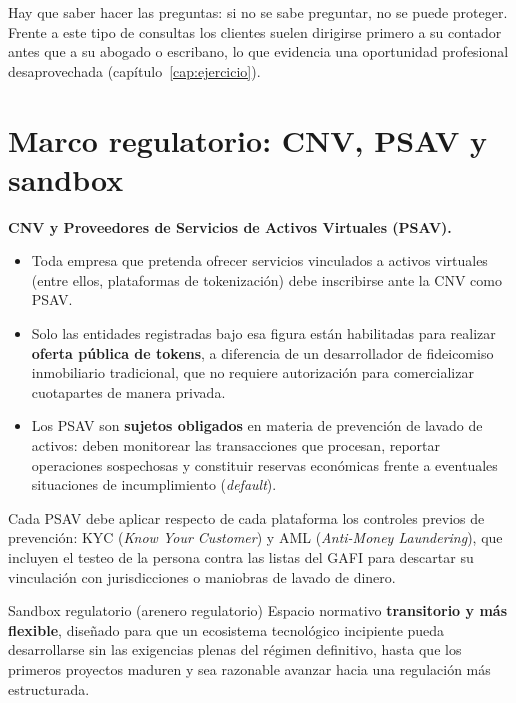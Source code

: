 \documentclass[12pt,oneside]{book}
\begin{document}
Hay que saber hacer las preguntas: si no se sabe preguntar, no se puede proteger. Frente a este tipo de consultas los clientes suelen dirigirse primero a su contador antes que a su abogado o escribano, lo que evidencia una oportunidad profesional desaprovechada (capítulo~\ref{cap:ejercicio}).

\section{Marco regulatorio: CNV, PSAV y sandbox}

\begin{important}
\textbf{CNV y Proveedores de Servicios de Activos Virtuales (PSAV).}
\begin{itemize}
    \item Toda empresa que pretenda ofrecer servicios vinculados a activos virtuales (entre ellos, plataformas de tokenización) debe inscribirse ante la CNV como PSAV.
    \item Solo las entidades registradas bajo esa figura están habilitadas para realizar \textbf{oferta pública de tokens}, a diferencia de un desarrollador de fideicomiso inmobiliario tradicional, que no requiere autorización para comercializar cuotapartes de manera privada.
    \item Los PSAV son \textbf{sujetos obligados} en materia de prevención de lavado de activos: deben monitorear las transacciones que procesan, reportar operaciones sospechosas y constituir reservas económicas frente a eventuales situaciones de incumplimiento (\emph{default}).
\end{itemize}
\end{important}

Cada PSAV debe aplicar respecto de cada plataforma los controles previos de prevención: KYC (\emph{Know Your Customer}) y AML (\emph{Anti-Money Laundering}), que incluyen el testeo de la persona contra las listas del GAFI para descartar su vinculación con jurisdicciones o maniobras de lavado de dinero.

\begin{definition}{Sandbox regulatorio (arenero regulatorio)}
Espacio normativo \textbf{transitorio y más flexible}, diseñado para que un ecosistema tecnológico incipiente pueda desarrollarse sin las exigencias plenas del régimen definitivo, hasta que los primeros proyectos maduren y sea razonable avanzar hacia una regulación más estructurada.
\end{definition}
\end{document}
